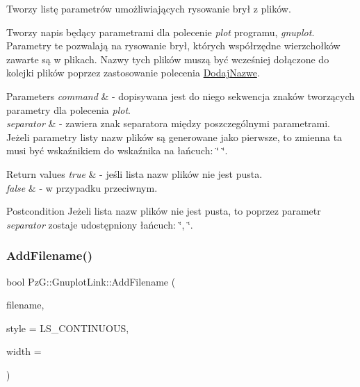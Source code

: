Tworzy listę parametrów umożliwiających rysowanie brył z plików. 

Tworzy napis będący parametrami dla polecenie {\itshape plot} programu, {\itshape gnuplot}. Parametry te pozwalają na rysowanie brył, których współrzędne wierzchołków zawarte są w plikach. Nazwy tych plików muszą być wcześniej dołączone do kolejki plików poprzez zastosowanie polecenia \hyperlink{}{Dodaj\+Nazwe}.


\begin{DoxyParams}{Parameters}
{\em command} & -\/ dopisywana jest do niego sekwencja znaków tworzących parametry dla polecenia {\itshape plot}. \\
\hline
{\em separator} & -\/ zawiera znak separatora między poszczególnymi parametrami. Jeżeli parametry listy nazw plików są generowane jako pierwsze, to zmienna ta musi być wskaźnikiem do wskaźnika na łańcuch\+: \char`\"{} \char`\"{}. \\
\hline
\end{DoxyParams}

\begin{DoxyRetVals}{Return values}
{\em true} & -\/ jeśli lista nazw plików nie jest pusta. \\
\hline
{\em false} & -\/ w przypadku przeciwnym. \\
\hline
\end{DoxyRetVals}
\begin{DoxyPostcond}{Postcondition}
Jeżeli lista nazw plików nie jest pusta, to poprzez parametr {\itshape separator} zostaje udostępniony łańcuch\+: \char`\"{}, \char`\"{}. 
\end{DoxyPostcond}
\mbox{\label{class_pz_g_1_1_gnuplot_link_a795ee974694d79694496e09d668eb562}} 
\subsubsection{\texorpdfstring{Add\+Filename()}{AddFilename()}}
{\footnotesize\ttfamily bool Pz\+G\+::\+Gnuplot\+Link\+::\+Add\+Filename (\begin{DoxyParamCaption}\item[{const char $\ast$}]{filename,  }\item[{\hyperlink{namespace_pz_g_ab0580cdb6bfe9e51d7de2588bc824076}{Line\+Style}}]{style = {\ttfamily LS\+\_\+CONTINUOUS},  }\item[{int}]{width = {} }\end{DoxyParamCaption})}



